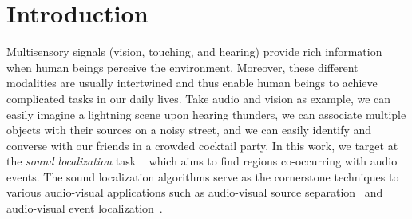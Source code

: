 \section{Introduction}\label{sec:intro}


Multisensory signals (\eg vision, touching, and hearing) provide rich information when human beings perceive the environment.
%
Moreover, these different modalities are usually intertwined and thus enable human beings to achieve complicated tasks in our daily lives.
%
Take audio and vision as example, we can easily imagine a lightning scene upon hearing thunders, we can associate multiple objects with their sources on a noisy street, and we can easily identify and converse with our friends in a crowded cocktail party. 
%
In this work, we target at the \emph{sound localization} task ~\cite{av_cvpr18_lls,av_tpami20_lls,av_eccv20_mms_loc,av_nips20_loc} which aims to find regions co-occurring with audio events.
% 
The sound localization algorithms serve as the cornerstone techniques to various audio-visual applications such as audio-visual source separation~\cite{pix,av_eccv18_sep,co_sep_iccv19,sofm_iccv19,av_iccv19_mpnet,av_cvpr20_sep-gesture} and audio-visual event localization~\cite{eccv18_avel,av_eccv20_avvp}.
